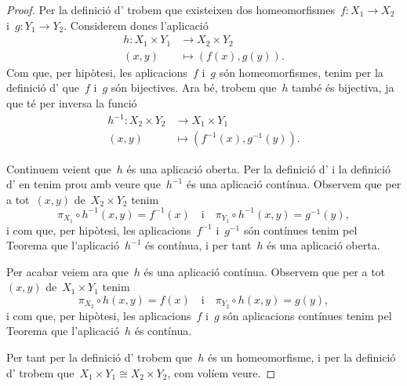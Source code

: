 \documentclass[../topologia.tex]{subfiles}
\begin{document}
    \begin{proof}
        Per la definició d' trobem que existeixen dos homeomorfismes~\(f\colon X_{1}\longrightarrow X_{2}\) i~\(g\colon Y_{1}\longrightarrow Y_{2}\).
        Considerem doncs l'aplicació
        \begin{align*}
            h\colon X_{1}\times Y_{1}&\longrightarrow X_{2}\times Y_{2} \\
            (x,y)&\longmapsto(f(x),g(y)).
        \end{align*}
        Com que, per hipòtesi, les aplicacions~\(f\) i~\(g\) són homeomorfismes, tenim per la definició d' que~\(f\) i~\(g\) són bijectives.
        Ara bé, trobem que~\(h\) també és bijectiva, ja que té per inversa la funció
        \begin{align*}
            h^{-1}\colon X_{2}\times Y_{2}&\longrightarrow X_{1}\times Y_{1} \\
            (x,y)&\longmapsto(f^{-1}(x),g^{-1}(y)).
        \end{align*}

        Continuem veient que~\(h\) és una aplicació oberta.
        Per la definició d' i la definició d' en tenim prou amb veure que~\(h^{-1}\) és una aplicació contínua.
        Observem que per a tot~\((x,y)\) de~\(X_{2}\times Y_{2}\) tenim
        \[
            \pi_{X_{1}}\circ h^{-1}(x,y)=f^{-1}(x)\quad\text{i}\quad\pi_{Y_{1}}\circ h^{-1}(x,y)=g^{-1}(y),
        \]
        i com que, per hipòtesi, les aplicacions~\(f^{-1}\) i~\(g^{-1}\) són contínues tenim pel Teorema  que l'aplicació~\(h^{-1}\) és contínua, i per tant~\(h\) és una aplicació oberta.

        Per acabar veiem ara que~\(h\) és una aplicació contínua.
        Observem que per a tot~\((x,y)\) de~\(X_{1}\times Y_{1}\) tenim
        \[
            \pi_{X_{2}}\circ h(x,y)=f(x)\quad\text{i}\quad\pi_{Y_{2}}\circ h(x,y)=g(y),
        \]
        i com que, per hipòtesi, les aplicacions~\(f\) i~\(g\) són aplicacions contínues tenim pel Teorema  que l'aplicació~\(h\) és contínua.

        Per tant per la definició d' trobem que~\(h\) és un homeomorfisme, i per la definició d' trobem que~\(X_{1}\times Y_{1}\cong X_{2}\times Y_{2}\), com volíem veure.
    \end{proof}
\end{document}
